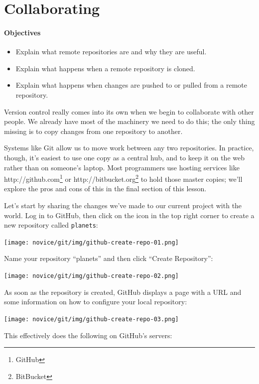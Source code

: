 \documentclass[]{book}
\newcommand{\urlfoot}[2]{{#1}\footnote{#2}}
\begin{document}
\section{Collaborating}

\mbox{}\paragraph{Objectives}

\begin{itemize}
\item
  Explain what remote repositories are and why they are useful.
\item
  Explain what happens when a remote repository is cloned.
\item
  Explain what happens when changes are pushed to or pulled from a
  remote repository.
\end{itemize}

Version control really comes into its own when we begin to collaborate
with other people. We already have most of the machinery we need to do
this; the only thing missing is to copy changes from one repository to
another.

Systems like Git allow us to move work between any two repositories. In
practice, though, it's easiest to use one copy as a central hub, and to
keep it on the web rather than on someone's laptop. Most programmers use
hosting services like \urlfoot{http://github.com}{GitHub} or
\urlfoot{http://bitbucket.org}{BitBucket} to hold those master copies;
we'll explore the pros and cons of this in the final section of this
lesson.

Let's start by sharing the changes we've made to our current project
with the world. Log in to GitHub, then click on the icon in the top
right corner to create a new repository called \texttt{planets}:

\texttt{[image: novice/git/img/github-create-repo-01.png]}

Name your repository ``planets'' and then click ``Create Repository'':

\texttt{[image: novice/git/img/github-create-repo-02.png]}

As soon as the repository is created, GitHub displays a page with a URL
and some information on how to configure your local repository:

\texttt{[image: novice/git/img/github-create-repo-03.png]}

This effectively does the following on GitHub's servers:
\end{document}
